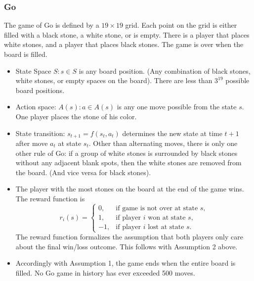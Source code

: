 \documentclass[11pt]{article}
\begin{document}
\subsubsection{Go}
The game of Go is defined by a $19\times19$ grid. Each point on the grid is either filled with a black
stone, a white stone, or is empty. There is a player that places white stones, and a player that
places black stones. The game is over when the board is filled.
\begin{itemize}
\item State Space $S:s\in S$ is any board position. (Any combination of black stones, white
stones, or empty spaces on the board). There are less than $3^{19}$ possible board positions.
\item Action space: $A(s):a\in A(s)$ is any one move possible from the state $s$. One player
places the stone of his color.
\item State transition: $s_{t+1}=f(s_t,a_t)$ determines the new state at time $t+1$ after move $a_t$
at state $s_t$. Other than alternating moves, there is only one other rule of Go: if a group
of white stones is surrounded by black stones without any adjacent blank spots, then the
white stones are removed from the board. (And vice versa for black stones).
\item The player with the most stones on the board at the end of the game wins. The reward
function is
\[
r_i(s)=
\begin{cases}
0, & \text{if game is not over at state }s,\\
1, & \text{if player }i\text{ won at state }s,\\
-1,& \text{if player }i\text{ lost at state }s.
\end{cases}
\]
The reward function formalizes the assumption that both players only care about the final
win/loss outcome. This follows with Assumption 2 above.
\item Accordingly with Assumption 1, the game ends when the entire board is filled. No Go
game in history has ever exceeded 500 moves.
\end{itemize}
\end{document}
